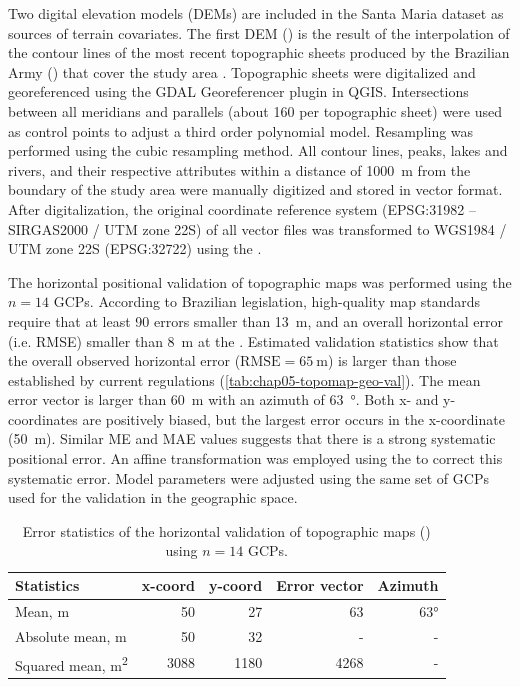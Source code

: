 Two digital elevation models (DEMs) are included in the Santa Maria dataset as sources of terrain covariates. 
The first DEM (\demNew) is the result of the interpolation of the contour lines of the most recent topographic 
sheets produced by the Brazilian 
Army () that cover the study area \cite{DSG1980, DSG1992, DSG1992a}. Topographic sheets were 
digitalized
and georeferenced using the GDAL Georeferencer plugin in QGIS. Intersections between all meridians and 
parallels (about \num{160} per topographic sheet) were used as control points to adjust a third order 
polynomial 
model. Resampling was performed using the cubic resampling method. All contour lines, peaks, lakes and rivers, 
and their respective attributes within a distance of \SI{1000}{\metre} from the boundary of the study area 
were manually digitized and stored in vector format. After digitalization, the original coordinate 
reference system (EPSG:31982 -- SIRGAS2000 / UTM zone 22S) of all vector files was transformed to WGS1984 / 
UTM zone 22S (EPSG:32722) using the  \cite{BivandEtAl2013a}.

The horizontal positional validation of topographic maps was performed using the $n = 14$ GCPs. According to 
Brazilian 
legislation, high-quality map standards require that at least 90%
errors 
smaller than \SI{13}{\metre}, and an overall horizontal error (i.e. RMSE) smaller than \SI{8}{\metre} at the 
\cite{Brasil1984}. Estimated validation statistics show that the overall observed horizontal error 
($\text{RMSE} = \SI{65}{\m}$) 
is larger than those established by current regulations (\autoref{tab:chap05-topomap-geo-val}). The mean error 
vector is larger than \SI{60}{\metre} with an azimuth of \SI{63}{\degree}. Both x- and y-coordinates are 
positively biased, but the largest error occurs in the x-coordinate (\SI{50}{\metre}). Similar ME and MAE 
values suggests that there is a strong systematic positional error. An affine transformation was employed 
using 
the  \cite{Carrillo2012} to correct this systematic error. Model parameters were 
adjusted 
using the same set of GCPs used for the validation in the geographic space.

\begin{table}[ht]
 \caption{Error statistics of the horizontal validation of topographic maps () using $n = 14$ 
 GCPs.}
 \label{tab:chap05-topomap-geo-val}
 \centering
 {\small
 \begin{tabular}{lrrrr}
  \hline
  Statistics                    & x-coord & y-coord & Error vector & Azimuth  \\
  \hline
  Mean, \si{\m}                 & 50      & 27      & 63           & \ang{63} \\ 
  Absolute mean, \si{\m}        & 50      & 32      & -            & -        \\ 
  Squared mean, \si{\m\squared} & 3088    & 1180    & 4268         & -        \\ 
  \hline
 \end{tabular}}
\end{table}

